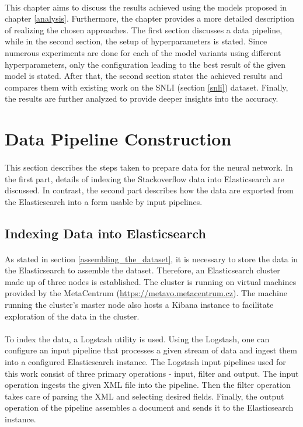 \paragraph{}
This chapter aims to discuss the results achieved using the models proposed in chapter \ref{analysis}. Furthermore, the chapter provides a more detailed description of realizing the chosen approaches. The first section discusses a data pipeline, while in the second section, the setup of hyperparameters is stated. Since numerous experiments are done for each of the model variants using different hyperparameters, only the configuration leading to the best result of the given model is stated. After that, the second section states the achieved results and compares them with existing work on the SNLI (section \ref{snli}) dataset. Finally, the results are further analyzed to provide deeper insights into the accuracy.

\section{Data Pipeline Construction}
\paragraph{}
This section describes the steps taken to prepare data for the neural network. In the first part, details of indexing the Stackoverflow data into Elasticsearch are discussed. In contrast, the second part describes how the data are exported from the Elasticsearch into a form usable by input pipelines.

\subsection{Indexing Data into Elasticsearch}\label{indexind_the_data}
\paragraph{}
As stated in section \ref{assembling_the_dataset}, it is necessary to store the data in the Elasticsearch to assemble the dataset. Therefore, an Elasticsearch cluster made up of three nodes is established. The cluster is running on virtual machines provided by the MetaCentrum (\url{https://metavo.metacentrum.cz}). The machine running the cluster's master node also hosts a Kibana instance to facilitate exploration of the data in the cluster.

\paragraph{}
To index the data, a Logstash utility is used. Using the Logstash, one can configure an input pipeline that processes a given stream of data and ingest them into a configured Elasticsearch instance. The Logstash input pipelines used for this work consist of three primary operations - input, filter and output. The input operation ingests the given XML file into the pipeline. Then the filter operation takes care of parsing the XML and selecting desired fields. Finally, the output operation of the pipeline assembles a document and sends it to the Elasticsearch instance.

